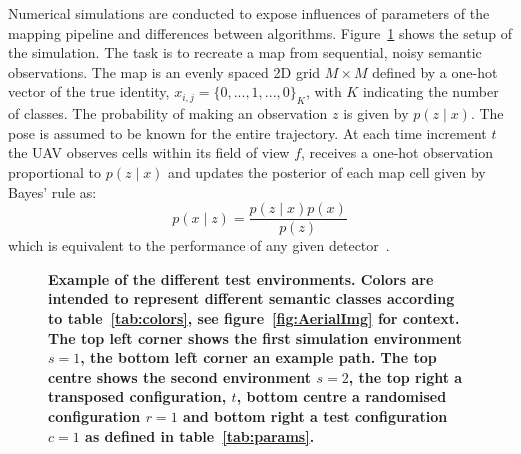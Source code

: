\documentclass[twocolumn,letterpaper]{IEEEAerospaceCLS}  %
\begin{document}
Numerical simulations are conducted to expose influences of parameters of the mapping pipeline and differences between algorithms. Figure~\ref{fig:SimCase} shows the setup of the simulation. The task is to recreate a map from sequential, noisy semantic observations. The map is an evenly spaced 2D grid $M \times M$ defined by a one-hot vector of the true identity, $x_{i,j} = \{0,..., 1, ..., 0\}_K$, with $K$ indicating the number of classes. The probability of making an observation $z$ is given by $p(z\mid x)$. The pose is assumed to be known for the entire trajectory. At each time increment $t$ the UAV observes cells within its field of view $f$, receives a one-hot observation proportional to $p(z\mid x)$ and updates the posterior of each map cell given by Bayes' rule as:
\begin{equation} \label{eq:Bayes}
    p(x\mid z) = \frac{p(z\mid x) p(x)}{p(z)}
\end{equation}
which is equivalent to the performance of any given detector~\cite{alom_history_2018}.
\begin{figure}[t]
    \centering
    \caption{\bf{
        Example of the different test environments. Colors are intended to represent different semantic classes according to table~\ref{tab:colors}, see figure~\ref{fig:AerialImg} for context. The top left corner shows the first simulation environment $s=1$, the bottom left corner an example path. The top centre shows the second environment $s=2$, the top right a transposed configuration, $t$, bottom centre a randomised configuration $r=1$ and bottom right a test configuration $c=1$ as defined in table~\ref{tab:params}.
    }}
    \label{fig:SimCase}
\end{figure}
\end{document}

